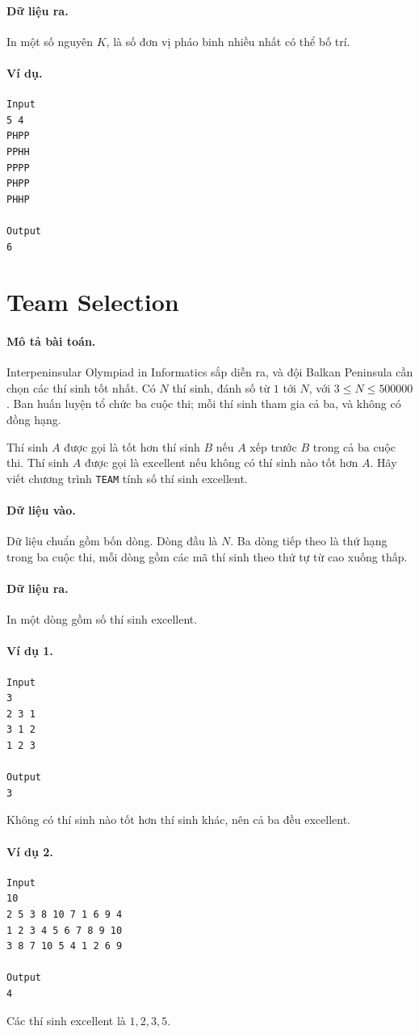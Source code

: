 \documentclass[11pt]{article}
\begin{document}
\paragraph{Dữ liệu ra.}
In một số nguyên $K$, là số đơn vị pháo binh nhiều nhất có thể bố trí.

\paragraph{Ví dụ.}
\begin{verbatim}
Input
5 4
PHPP
PPHH
PPPP
PHPP
PHHP

Output
6
\end{verbatim}

\section{Team Selection}

\paragraph{Mô tả bài toán.}
Interpeninsular Olympiad in Informatics sắp diễn ra, và đội Balkan Peninsula
cần chọn các thí sinh tốt nhất. Có $N$ thí sinh, đánh số từ $1$ tới $N$,
với $3\le N\le 500000$. Ban huấn luyện tổ chức ba cuộc thi; mỗi thí sinh tham
gia cả ba, và không có đồng hạng.

Thí sinh $A$ được gọi là tốt hơn thí sinh $B$ nếu $A$ xếp trước $B$ trong cả
ba cuộc thi. Thí sinh $A$ được gọi là excellent nếu không có thí sinh nào tốt
hơn $A$. Hãy viết chương trình \texttt{TEAM} tính số thí sinh excellent.

\paragraph{Dữ liệu vào.}
Dữ liệu chuẩn gồm bốn dòng. Dòng đầu là $N$. Ba dòng tiếp theo là thứ hạng
trong ba cuộc thi, mỗi dòng gồm các mã thí sinh theo thứ tự từ cao xuống thấp.

\paragraph{Dữ liệu ra.}
In một dòng gồm số thí sinh excellent.

\paragraph{Ví dụ 1.}
\begin{verbatim}
Input
3
2 3 1
3 1 2
1 2 3

Output
3
\end{verbatim}
Không có thí sinh nào tốt hơn thí sinh khác, nên cả ba đều excellent.

\paragraph{Ví dụ 2.}
\begin{verbatim}
Input
10
2 5 3 8 10 7 1 6 9 4
1 2 3 4 5 6 7 8 9 10
3 8 7 10 5 4 1 2 6 9

Output
4
\end{verbatim}
Các thí sinh excellent là $1,2,3,5$.
\end{document}
